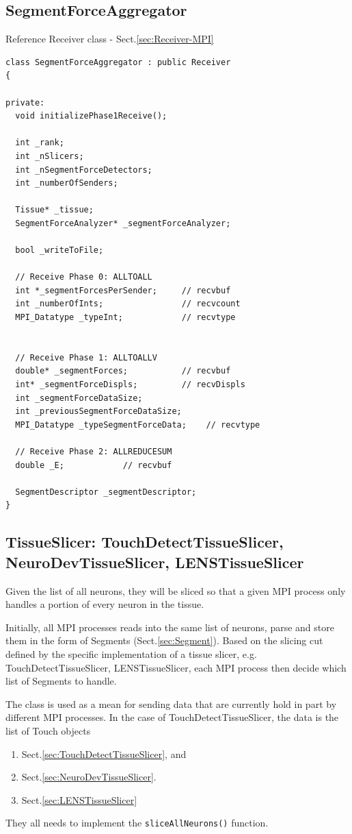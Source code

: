 \subsection{SegmentForceAggregator}
\label{sec:SegmentForceAggregator}

Reference Receiver class - Sect.\ref{sec:Receiver-MPI}
\begin{verbatim}  
class SegmentForceAggregator : public Receiver 
{

private:
  void initializePhase1Receive();

  int _rank;
  int _nSlicers;
  int _nSegmentForceDetectors;
  int _numberOfSenders;

  Tissue* _tissue;
  SegmentForceAnalyzer* _segmentForceAnalyzer;
	
  bool _writeToFile;

  // Receive Phase 0: ALLTOALL
  int *_segmentForcesPerSender;     // recvbuf
  int _numberOfInts;                // recvcount
  MPI_Datatype _typeInt;            // recvtype

        
  // Receive Phase 1: ALLTOALLV
  double* _segmentForces; 			// recvbuf
  int* _segmentForceDispls;         // recvDispls
  int _segmentForceDataSize;
  int _previousSegmentForceDataSize;
  MPI_Datatype _typeSegmentForceData;    // recvtype

  // Receive Phase 2: ALLREDUCESUM
  double _E; 			// recvbuf

  SegmentDescriptor _segmentDescriptor;
} 
\end{verbatim}

\subsection{TissueSlicer: TouchDetectTissueSlicer, NeuroDevTissueSlicer,
LENSTissueSlicer}
\label{sec:TissueSlicer}

Given the list of all neurons, they will be sliced so that a given MPI process
only handles a portion of every neuron in the tissue.

Initially, all MPI processes reads into the same list of neurons, parse and
store them in the form of Segments (Sect.\ref{sec:Segment}). Based on the
slicing cut defined by the specific implementation of a tissue slicer, e.g. TouchDetectTissueSlicer,
LENSTissueSlicer, each MPI process then decide which list of Segments to handle. 

The class is used as a mean for sending data that are currently hold in part
by different MPI processes. In the case of TouchDetectTissueSlicer, the data
is the list of Touch objects
\begin{enumerate}
  \item Sect.\ref{sec:TouchDetectTissueSlicer}, and 
  
  \item Sect.\ref{sec:NeuroDevTissueSlicer}.
  
  \item Sect.\ref{sec:LENSTissueSlicer}
\end{enumerate}
They all needs to implement the \verb!sliceAllNeurons()! function.

